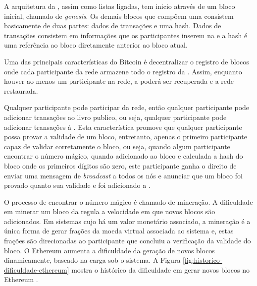 \documentclass[tcc,capa]{texufpel}
\begin{document}
    A arquitetura da \bchain, assim como listas ligadas, tem inicio através de um bloco inicial, chamado de \textit{genesis}. Os demais blocos que compõem uma \bchain consistem basicamente de duas partes: dados de transações e uma hash. Dados de transações consistem em informações que os participantes inserem na \bchain e a hash é uma referência ao bloco diretamente anterior ao bloco atual.
    
    Uma das principais características do Bitcoin é decentralizar o registro de blocos onde cada participante da rede armazene todo o registro da \bchain. Assim, enquanto houver ao menos um participante na rede, a \bchain poderá ser recuperada e a rede restaurada.
    
    Qualquer participante pode participar da rede, então qualquer participante pode adicionar transações ao livro publico, ou seja, qualquer participante pode adicionar transações à \bchain. Esta característica promove que qualquer participante possa provar a validade de um bloco, entretanto, apenas o primeiro participante capaz de validar corretamente o bloco, ou seja, quando algum participante encontrar o número mágico, quando adicionado ao bloco e calculada a hash do bloco onde os primeiros dígitos são zero, este participante ganha o direito de enviar uma mensagem de \textit{broadcast} a todos os nós e anunciar que um bloco foi provado quanto sua validade e foi adicionado a \bchain.
    
    O processo de encontrar o número mágico é chamado de mineração. A dificuldade em minerar um bloco da \bchain regula a velocidade em que novos blocos são adicionados. Em sistemas cujo há um valor monetário associado, a mineração é a única forma de gerar frações da moeda virtual associada ao sistema e, estas frações são direcionadas ao participante que concluiu a verificação da validade do bloco. O Ethereum aumenta a dificuldade da geração de novos blocos dinamicamente, baseado na carga sob o sistema. A Figura \ref{fig:historico-dificuldade-ethereum} mostra o histórico da dificuldade em gerar novos blocos no Ethereum \cite{team2017etherscan}.
    
\end{document}
